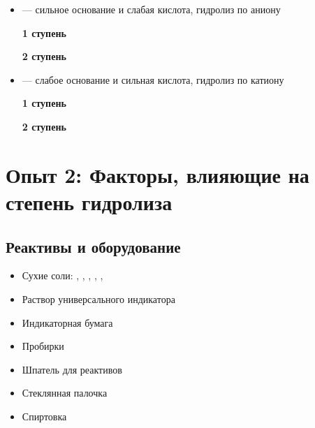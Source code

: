 \documentclass[a4paper, 12pt]{article}
\begin{document}
\begin{itemize}
	
	\item {} --- сильное основание и слабая кислота, гидролиз по аниону
	
	\textbf{1 ступень}
	
	
	
	\textbf{2 ступень}
	
	
	
	\item {} --- слабое основание и сильная кислота, гидролиз по катиону
	
	\textbf{1 ступень}
	
	
	
	\textbf{2 ступень}
	
	
	
\end{itemize}




\section{Опыт 2: Факторы, влияющие на степень гидролиза}

\subsection{Реактивы и оборудование}

\begin{itemize}
	\item Сухие соли: , , , , , 
	
	\item Раствор универсального индикатора
	
	\item Индикаторная бумага
	
	\item Пробирки
	
	\item Шпатель для реактивов
	
	\item Стеклянная палочка
	
	\item Спиртовка
\end{itemize}
\end{document}
